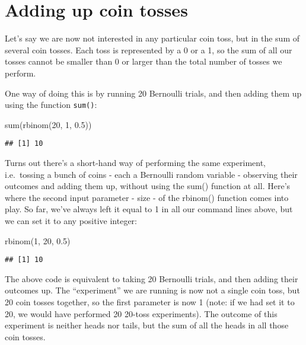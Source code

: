 \documentclass[
]{book}
\newenvironment{Shaded}{\begin{snugshade}}{\end{snugshade}}
\newcommand{\DecValTok}[1]{\textcolor[rgb]{0.00,0.00,0.81}{#1}}
\newcommand{\FloatTok}[1]{\textcolor[rgb]{0.00,0.00,0.81}{#1}}
\newcommand{\FunctionTok}[1]{\textcolor[rgb]{0.00,0.00,0.00}{#1}}
\newcommand{\NormalTok}[1]{#1}
\begin{document}
\hypertarget{adding-up-coin-tosses}{%
\section{Adding up coin tosses}\label{adding-up-coin-tosses}}

Let's say we are now not interested in any particular coin toss, but in the sum of several coin tosses. Each toss is represented by a 0 or a 1, so the sum of all our tosses cannot be smaller than 0 or larger than the total number of tosses we perform.

One way of doing this is by running 20 Bernoulli trials, and then adding them up using the function \texttt{sum()}:

\begin{Shaded}
\begin{Highlighting}[]
\FunctionTok{sum}\NormalTok{(}\FunctionTok{rbinom}\NormalTok{(}\DecValTok{20}\NormalTok{, }\DecValTok{1}\NormalTok{, }\FloatTok{0.5}\NormalTok{))}
\end{Highlighting}
\end{Shaded}

\begin{verbatim}
## [1] 10
\end{verbatim}

Turns out there's a short-hand way of performing the same experiment, i.e.~tossing a bunch of coins - each a Bernoulli random variable - observing their outcomes and adding them up, without using the sum() function at all. Here's where the second input parameter - size - of the rbinom() function comes into play. So far, we've always left it equal to 1 in all our command lines above, but we can set it to any positive integer:

\begin{Shaded}
\begin{Highlighting}[]
\FunctionTok{rbinom}\NormalTok{(}\DecValTok{1}\NormalTok{, }\DecValTok{20}\NormalTok{, }\FloatTok{0.5}\NormalTok{)}
\end{Highlighting}
\end{Shaded}

\begin{verbatim}
## [1] 10
\end{verbatim}

The above code is equivalent to taking 20 Bernoulli trials, and then adding their outcomes up. The ``experiment'' we are running is now not a single coin toss, but 20 coin tosses together, so the first parameter is now 1 (note: if we had set it to 20, we would have performed 20 20-toss experiments). The outcome of this experiment is neither heads nor tails, but the sum of all the heads in all those coin tosses.
\end{document}
